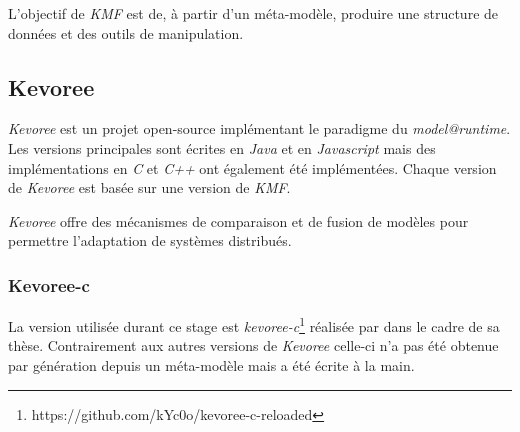 L'objectif de \emph{KMF} est de, à partir d'un méta-modèle, produire une structure de données et des outils de manipulation.

\subsection{\label{kevoree}Kevoree}

\emph{Kevoree} est un projet open-source implémentant le paradigme du \emph{model@runtime}. Les versions principales sont écrites en \emph{Java} et en \emph{Javascript} mais des implémentations en \emph{C} et \emph{C++} ont également été implémentées. Chaque version de \emph{Kevoree} est basée sur une version de \emph{KMF}. 

\emph{Kevoree} offre des mécanismes de comparaison et de fusion de modèles pour permettre l'adaptation de systèmes distribués.

\subsubsection{Kevoree-c}

La version utilisée durant ce stage est \emph{kevoree-c}\footnote{https://github.com/kYc0o/kevoree-c-reloaded} réalisée par \paco dans le cadre de sa thèse. Contrairement aux autres versions de \emph{Kevoree} celle-ci n'a pas été obtenue par génération depuis un méta-modèle mais a été écrite à la main.



